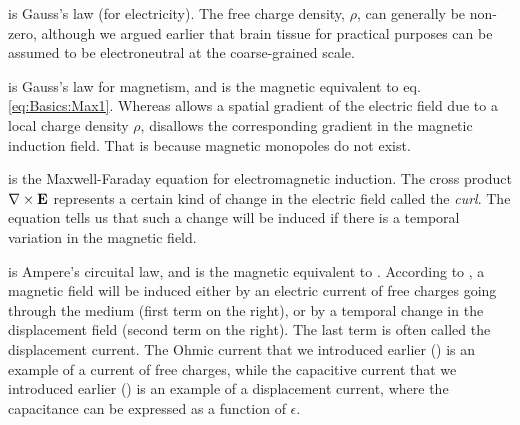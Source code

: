  is Gauss's law (for electricity). The free charge density, $\rho$, can generally be non-zero, although we argued earlier that brain tissue for practical purposes can be assumed to be electroneutral at the coarse-grained scale.

 is Gauss's law for magnetism, and is the magnetic equivalent to eq. \ref{eq:Basics:Max1}. Whereas  allows a spatial gradient of the electric field due to a local charge density $\rho$,  disallows the corresponding gradient in the magnetic induction field. That is because magnetic monopoles do not exist. 

 is the Maxwell-Faraday equation for electromagnetic induction. The cross product ${\bf \nabla} \times {\bf E}$ represents a certain kind of change in the electric field called the \textit{curl}. The equation tells us that such a change will be induced if there is a temporal variation in the magnetic field.

 is Ampere's circuital law, and is the magnetic equivalent to . According to , a magnetic field will be induced either by an electric current of free charges going through the medium (first term on the right), or by a temporal change in the displacement field (second term on the right). The last term is often called the displacement current. The Ohmic current that we introduced earlier () is an example of a current of free charges, while the capacitive current that we introduced earlier () is an example of a displacement current, where the capacitance can be expressed as a function of $\epsilon$.

